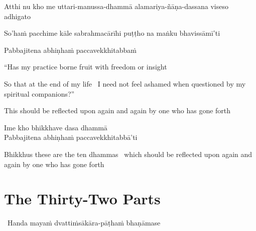 \begin{pali-hang}
  Atthi nu kho me uttari-manussa-dhammā alamariya-ñāṇa-dassana viseso adhigato\\
\end{pali-hang}


\begin{pali-hangtogether}
  So'haṁ pacchime kāle sabrahmacārīhi puṭṭho na maṅku bhavissāmī'ti\\
\end{pali-hangtogether}
Pabbajitena abhiṇhaṁ paccavekkhitabbaṁ

\begin{english-verses}
  ``Has my practice borne fruit with freedom or insight\\
  \begin{english-hangtogether-verses}
    So that at the end of my life \breathmark\ I need not feel ashamed when questioned by my spiritual companions?''
  \end{english-hangtogether-verses}
  \begin{english-hangtogether-verses}
    This should be reflected upon again and again by one who has gone forth
  \end{english-hangtogether-verses}
\end{english-verses}

Ime kho bhikkhave dasa dhammā\\
Pabbajitena abhiṇhaṁ paccavekkhitabbā'ti

\begin{english-hang-verses}
  Bhikkhus these are the ten dhammas \breathmark\ which should be reflected upon again and again by one who has gone forth
\end{english-hang-verses}

\suttaRef{[AN 10.48]}


\section{The Thirty-Two Parts}
\label{32-parts}

\begin{leader}
  \anglebracketleft\ \hspace{-0.5mm}Handa mayaṁ dvattiṁsākāra-pāṭhaṁ bhaṇāmase \hspace{-0.5mm}\anglebracketright\
\end{leader}

